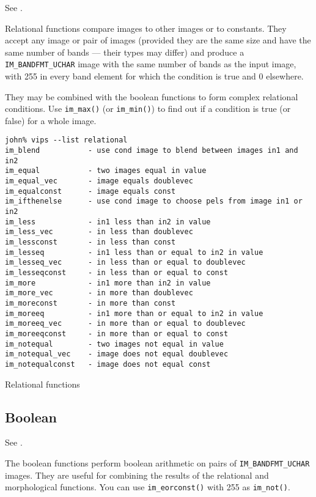See .

Relational functions compare images to other images or to constants. They
accept any image or pair of images (provided they are the same size and
have the same number of bands --- their types may differ) and produce a
\verb+IM_BANDFMT_UCHAR+ image with the same number of bands as the input
image, with 255 in every band element for which the condition is true and
0 elsewhere.

They may be combined with the boolean functions to form complex relational
conditions. Use \verb+im_max()+ (or \verb+im_min()+) to find out if a
condition is true (or false) for a whole image.

\begin{fig2}
\begin{verbatim}
john% vips --list relational
im_blend           - use cond image to blend between images in1 and in2
im_equal           - two images equal in value
im_equal_vec       - image equals doublevec
im_equalconst      - image equals const
im_ifthenelse      - use cond image to choose pels from image in1 or in2
im_less            - in1 less than in2 in value
im_less_vec        - in less than doublevec
im_lessconst       - in less than const
im_lesseq          - in1 less than or equal to in2 in value
im_lesseq_vec      - in less than or equal to doublevec
im_lesseqconst     - in less than or equal to const
im_more            - in1 more than in2 in value
im_more_vec        - in more than doublevec
im_moreconst       - in more than const
im_moreeq          - in1 more than or equal to in2 in value
im_moreeq_vec      - in more than or equal to doublevec
im_moreeqconst     - in more than or equal to const
im_notequal        - two images not equal in value
im_notequal_vec    - image does not equal doublevec
im_notequalconst   - image does not equal const
\end{verbatim}
\caption{Relational functions}
\label{fg:relational}
\end{fig2}

\subsection{Boolean}

See .

The boolean functions perform boolean arithmetic on pairs of
\verb+IM_BANDFMT_UCHAR+ images. They are useful for combining the results of
the relational and morphological functions. You can use 
\verb+im_eorconst()+ with 255 as \verb+im_not()+.

